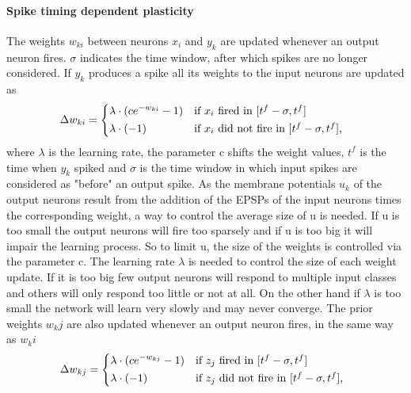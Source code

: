 \paragraph{Spike timing dependent plasticity}
The weights $w_{ki}$ between neurons $x_i$ and $y_k$ are updated whenever an output neuron fires. $\sigma$ indicates the time window, after which spikes are no longer considered. If $y_k$ produces a spike all its weights to the input neurons are updated as
\begin{equation}
\label{deltawki}
\Delta w_{ki} = \begin{dcases*} \lambda \cdot (ce^{-w_{ki}} - 1) & if $x_{i}$ fired in $ [t^f - \sigma, t^f] $ \\
\lambda \cdot (-1) & \text{if $ x_i $ did not fire in $ [t^f - \sigma, t^f] $, } \end{dcases*}
\end{equation}
where $\lambda$ is the learning rate, the parameter c shifts the weight values, $t^f$ is the time when $y_k$ spiked and $\sigma$ is the time window in which input spikes are considered as "before" an output spike. As the membrane potentials $u_k$ of the output neurons result from the addition of the EPSPs of the input neurons times the corresponding weight, a way to control the average size of u is needed. If u is too small the output neurons will fire too sparsely and if u is too big it will impair the learning process. So to limit u, the size of the weights is controlled via the parameter c. The learning rate $\lambda$ is needed to control the size of each weight update. If it is too big few output neurons will respond to multiple input classes and others will only respond too little or not at all. On the other hand if $\lambda$ is too small the network will learn very slowly and may never converge.
The prior weights $w_kj$ are also updated whenever an output neuron fires, in the same way as $w_ki$
\begin{equation}
\label{deltawki}
\Delta w_{kj} = \begin{dcases*} \lambda \cdot (ce^{-w_{kj}} - 1) & if $z_{j}$ fired in $ [t^f - \sigma, t^f] $ \\
\lambda \cdot (-1) & \text{if $ z_j $ did not fire in $ [t^f - \sigma, t^f] $, } \end{dcases*}
\end{equation}


